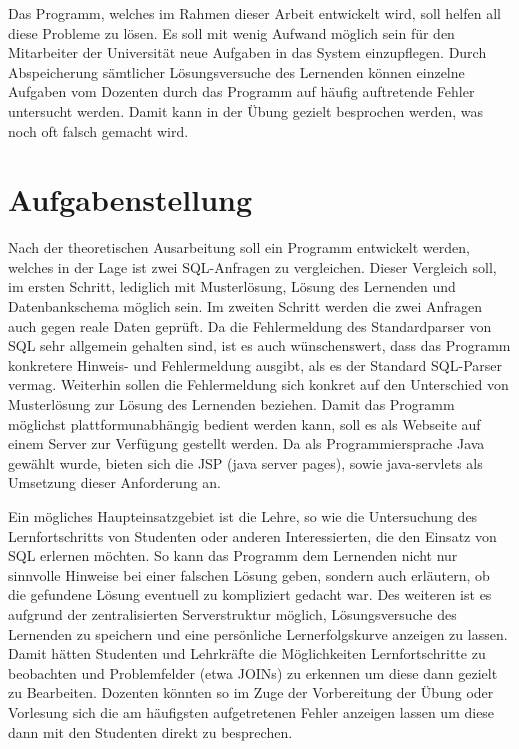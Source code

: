 Das Programm, welches im Rahmen dieser Arbeit entwickelt wird, soll helfen all diese Probleme zu lösen. Es soll mit wenig Aufwand möglich sein für den Mitarbeiter der Universität neue Aufgaben in das System einzupflegen. Durch Abspeicherung sämtlicher Lösungsversuche des Lernenden können einzelne Aufgaben vom Dozenten durch das Programm auf häufig auftretende Fehler untersucht werden. Damit kann in der Übung gezielt besprochen werden, was noch oft falsch gemacht wird.

\section{Aufgabenstellung}

Nach der theoretischen Ausarbeitung soll ein Programm entwickelt werden, welches in der Lage ist zwei SQL-Anfragen zu vergleichen. Dieser Vergleich soll, im ersten Schritt, lediglich mit Musterlösung, Lösung des Lernenden und Datenbankschema möglich sein. Im zweiten Schritt werden die zwei Anfragen auch gegen reale Daten geprüft. Da die Fehlermeldung des Standardparser von SQL sehr allgemein gehalten sind, ist es auch wünschenswert, dass das Programm konkretere Hinweis- und Fehlermeldung ausgibt, als es der Standard SQL-Parser vermag. Weiterhin sollen die Fehlermeldung sich konkret auf den Unterschied von Musterlösung zur Lösung des Lernenden beziehen. Damit das Programm möglichst plattformunabhängig bedient werden kann, soll es als Webseite auf einem Server zur Verfügung gestellt werden. Da als Programmiersprache Java gewählt wurde, bieten sich die JSP (java server pages), sowie java-servlets als Umsetzung dieser Anforderung an.

Ein mögliches Haupteinsatzgebiet ist die Lehre, so wie die Untersuchung des Lernfortschritts von Studenten oder anderen Interessierten, die den Einsatz von SQL erlernen möchten. So kann das Programm dem Lernenden nicht nur sinnvolle Hinweise bei einer falschen Lösung geben, sondern auch erläutern, ob die gefundene Lösung eventuell zu kompliziert gedacht war. Des weiteren ist es aufgrund der zentralisierten Serverstruktur möglich, Lösungsversuche des Lernenden zu speichern und eine persönliche Lernerfolgskurve anzeigen zu lassen. Damit hätten Studenten und Lehrkräfte die Möglichkeiten Lernfortschritte zu beobachten und Problemfelder (etwa JOINs) zu erkennen um diese dann gezielt zu Bearbeiten. Dozenten könnten so im Zuge der Vorbereitung der Übung oder Vorlesung sich die am häufigsten aufgetretenen Fehler anzeigen lassen um diese dann mit den Studenten direkt zu besprechen.

